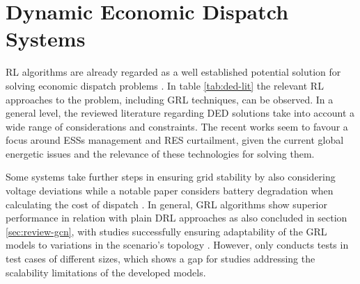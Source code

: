 \section{Dynamic Economic Dispatch Systems} \label{sec:review-ded}

\ac{RL} algorithms are already regarded as a well established potential solution for solving economic dispatch problems \cite{pereraApplicationsReinforcementLearning2021}. In table \ref{tab:ded-lit} the relevant \ac{RL} approaches to the problem, including \ac{GRL} techniques, can be observed. In a general level, the reviewed literature regarding \ac{DED} solutions take into account a wide range of considerations and constraints. The recent works seem to favour a focus around \acp{ESS} management and \ac{RES} curtailment, given the current global energetic issues and the relevance of these technologies for solving them. \par
Some systems \cite{chenScalableGraphReinforcement2023, hanAutonomousControlTechnology2023, zhaoGraphbasedDeepReinforcement2022} take further steps in ensuring grid stability by also considering voltage deviations while a notable paper considers battery degradation when calculating the cost of dispatch \cite{liuDistributedEconomicDispatch2018}. In general, \ac{GRL} algorithms show superior performance in relation with plain \ac{DRL} approaches \cite{chenScalableGraphReinforcement2023, liNovelGraphReinforcement2022, zhaoGraphbasedDeepReinforcement2022} as also concluded in section \ref{sec:review-gcn}, with studies successfully ensuring adaptability of the \ac{GRL} models to variations in the scenario's topology \cite{chenScalableGraphReinforcement2023, zhaoGraphbasedDeepReinforcement2022}. However, only \cite{baiAdaptiveActivePower2023b} conducts tests in test cases of different sizes, which shows a gap for studies addressing the scalability limitations of the developed models.

